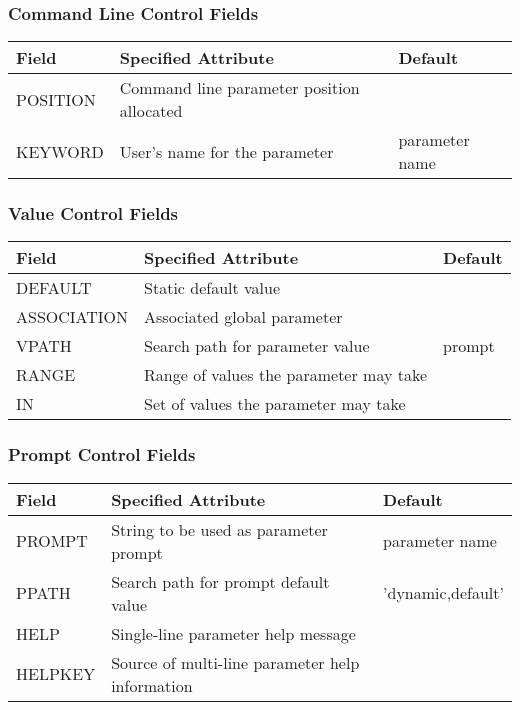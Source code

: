 \documentclass[twoside,11pt,nolof]{starlink}
\begin{document}
\subsubsection*{Command Line Control Fields}
\begin{center}
\begin{tabular}{|l|l|l|} \hline
Field & Specified Attribute & Default\\
\hline
POSITION & Command line parameter position allocated & \\
KEYWORD & User's name for the parameter & parameter
name \\
\hline
\end{tabular}
\end{center}

\subsubsection*{Value Control Fields}
\begin{center}
\begin{tabular}{|l|l|l|} \hline
Field & Specified Attribute & Default\\
\hline
DEFAULT & Static default value & \\
ASSOCIATION & Associated global parameter & \\
VPATH & Search path for parameter value & prompt\\
RANGE & Range of values the parameter may take & \\
IN & Set of values the parameter may take & \\
\hline
\end{tabular}
\end{center}

\subsubsection*{Prompt Control Fields}
\begin{center}
\begin{tabular}{|l|l|l|} \hline
Field & Specified Attribute & Default\\
\hline
PROMPT & String to be used as parameter prompt & parameter
name \\
PPATH & Search path for prompt default value & 'dynamic,default' \\
HELP & Single-line parameter help message & \\
HELPKEY & Source of multi-line parameter help information & \\
\hline
\end{tabular}
\end{center}
\end{document}
